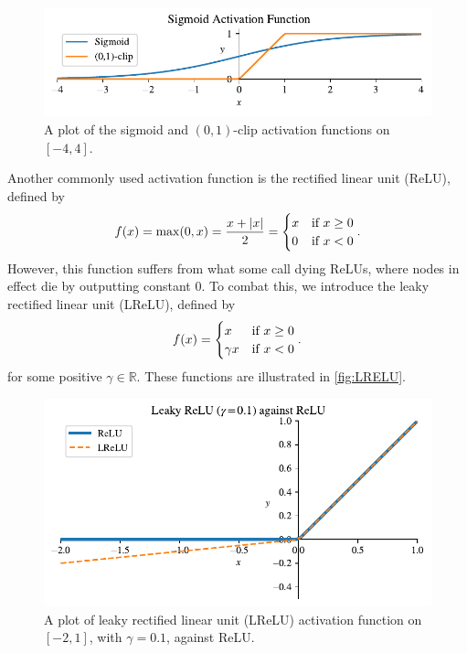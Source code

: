 \documentclass{article}
\theoremstyle{definition}
\begin{document}
\begin{figure}[ht]
    \centering
    \includegraphics[width=.7\textwidth]{activators/sigmoid.pdf}
    \caption{A plot of the sigmoid and $(0,1)$-clip activation functions on $[-4, 4]$.}
    \label{fig:sigmoid}
\end{figure}


Another commonly used activation function is the rectified linear unit (ReLU), defined by
\begin{equation*}
    f(x) = \max(0, x) = \frac{x + |x|}{2} =
    \begin{cases}
        x & \textnormal{if } x \geq 0 \\
        0 & \textnormal{if } x < 0
    \end{cases}.
\end{equation*}
However, this function suffers from what some call dying ReLUs, where nodes in effect die by outputting constant $0$. To combat this, we introduce the leaky rectified linear unit (LReLU), defined by
\begin{equation*}
    f(x) =
    \begin{cases}
        x & \textnormal{if } x \geq 0 \\
        \gamma x & \textnormal{if } x < 0
    \end{cases}.
\end{equation*}
for some positive $\gamma \in \mathbb{R}$. These functions are illustrated in \autoref{fig:LRELU}.

\begin{figure}[ht]
    \centering
    \includegraphics[width=.7\textwidth]{activators/LReLU.pdf}
    \caption{A plot of leaky rectified linear unit (LReLU) activation function on $[-2, 1]$, with $\gamma=0.1$, against ReLU.}
    \label{fig:LRELU}
\end{figure}
\end{document}
